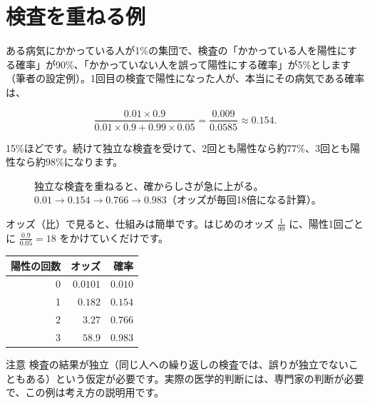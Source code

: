 \documentclass[a4paper,11pt,openany]{ltjsbook}
\begin{document}
\section{検査を重ねる例}

ある病気にかかっている人が1\%の集団で、検査の「かかっている人を陽性にする確率」が90\%、「かかっていない人を誤って陽性にする確率」が5\%とします（筆者の設定例）。1回目の検査で陽性になった人が、本当にその病気である確率は、

\[
\frac{0.01\times0.9}{0.01\times0.9+0.99\times0.05}=\frac{0.009}{0.0585}\approx0.154.
\]

15\%ほどです。続けて独立な検査を受けて、2回とも陽性なら約77\%、3回とも陽性なら約98\%になります。

\begin{figure}[htbp]
\centering
{}
\caption{独立な検査を重ねると、確からしさが急に上がる。$0.01\to0.154\to0.766\to0.983$（オッズが毎回18倍になる計算）。}
\end{figure}

オッズ（比）で見ると、仕組みは簡単です。はじめのオッズ $\frac{1}{99}$ に、陽性1回ごとに $\frac{0.9}{0.05}=18$ をかけていくだけです。

\begin{center}
\begin{tabular}{rrr}
\toprule
陽性の回数 & オッズ & 確率\\
\midrule
0 & $0.0101$ & $0.010$\\
1 & $0.182$ & $0.154$\\
2 & $3.27$ & $0.766$\\
3 & $58.9$ & $0.983$\\
\bottomrule
\end{tabular}
\end{center}

\begin{notebox}{注意}
検査の結果が独立（同じ人への繰り返しの検査では、誤りが独立でないこともある）という仮定が必要です。実際の医学的判断には、専門家の判断が必要で、この例は考え方の説明用です。
\end{notebox}
\end{document}
